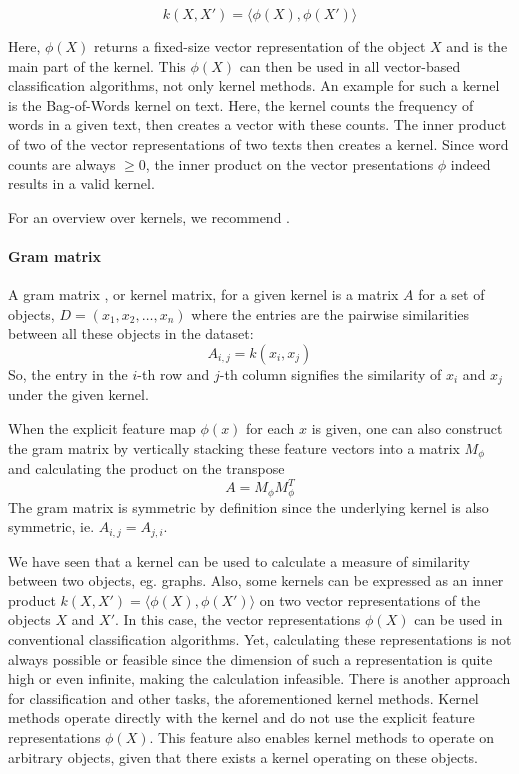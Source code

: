 \begin{equation*}
    k(X, X') = \langle \phi(X), \phi(X') \rangle
\end{equation*}

Here, $\phi(X)$ returns a fixed-size vector representation of the object $X$ and is the main part of the kernel.
This $\phi(X)$ can then be used in all vector-based classification algorithms, not only kernel methods.
An example for such a kernel is the Bag-of-Words kernel on text.
Here, the kernel counts the frequency of words in a given text, then creates a vector with these counts.
The inner product of two of the vector representations of two texts then creates a kernel.
Since word counts are always $\geq 0$, the inner product on the vector presentations $\phi$ indeed results in a valid kernel.

For an overview over kernels, we recommend \cite[p.~293]{Bishop2006}.

\paragraph{Gram matrix}
A gram matrix \cite[p.~293]{Bishop2006}, or kernel matrix, for a given kernel is a matrix $A$ for a set of objects, $D = (x_1, x_2, \ldots, x_n)$ where the entries are the pairwise similarities between all these objects in the dataset:
\begin{equation*}
A_{i,j} = k(x_i, x_j)
\end{equation*}
So, the entry in the $i$-th row and $j$-th column signifies the similarity of $x_i$ and $x_j$ under the given kernel.

When the explicit feature map $\phi(x)$ for each $x$ is given, one can also construct the gram matrix by vertically stacking these feature vectors into a matrix $M_{\phi}$ and calculating the product on the transpose
\begin{equation*}
A = M_{\phi} M_{\phi}^T
\end{equation*}
The gram matrix is symmetric by definition since the underlying kernel is also symmetric, ie. $A_{i,j} = A_{j, i}$.

We have seen that a kernel can be used to calculate a measure of similarity between two objects, eg. graphs.
Also, some kernels can be expressed as an inner product $k(X, X') = \langle \phi(X), \phi(X') \rangle$ on two vector representations of the objects $X$ and $X'$.
In this case, the vector representations $\phi(X)$ can be used in conventional classification algorithms.
Yet, calculating these representations is not always possible or feasible since the dimension of such a representation is quite high or even infinite, making the calculation infeasible.
There is another approach for classification and other tasks, the aforementioned kernel methods.
Kernel methods \cite[p.~291]{Bishop2006} operate directly with the kernel and do not use the explicit feature representations $\phi(X)$.
This feature also enables kernel methods to operate on arbitrary objects, given that there exists a kernel operating on these objects.

